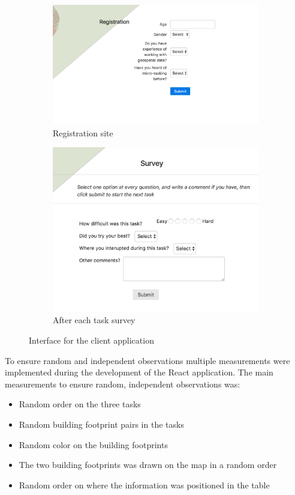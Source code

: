\begin{figure}[H]
	\centering
	\begin{subfigure}[b]{0.40\textwidth}
		\centering
		\includegraphics[width=\linewidth]{fig/mt-registration}
		\caption{Registration site}
		\label{fig:mt-registration}
	\end{subfigure}
	\begin{subfigure}[b]{0.35\textwidth}
		\centering
		\includegraphics[width=\linewidth]{fig/mt-survey}
		\caption{After each task survey}
		\label{fig:mt-survey}
	\end{subfigure}
	\caption{Interface for the client application}
	\label{fig:client-interface}
\end{figure}
       
To ensure random and independent observations multiple measurements were implemented during the development of the React application. The main measurements to ensure random, independent observations was:
\begin{itemize}
	\item Random order on the three tasks
	\item Random building footprint pairs in the tasks
	\item Random color on the building footprints
	\item The two building footprints was drawn on the map in a random order
	\item Random order on where the information was positioned in the table
\end{itemize}

